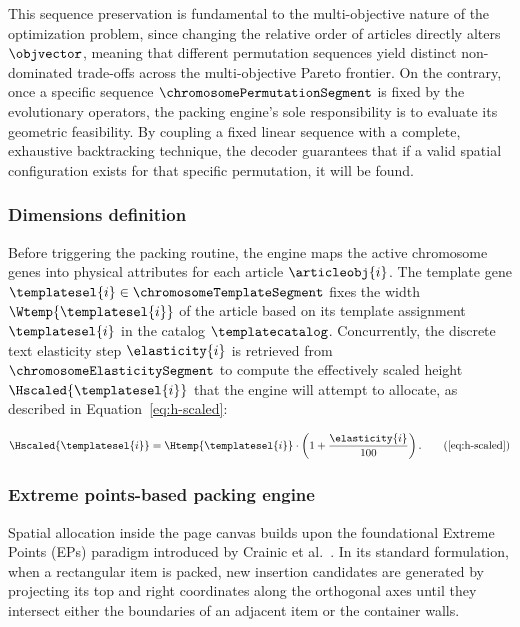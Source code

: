 This sequence preservation is fundamental to the multi-objective nature of the optimization problem, since changing the relative order of articles directly alters $\objvector$, meaning that different permutation sequences yield distinct non-dominated trade-offs across the multi-objective Pareto frontier.
On the contrary, once a specific sequence $\chromosomePermutationSegment$ is fixed by the evolutionary operators, the packing engine's sole responsibility is to evaluate its geometric feasibility. By coupling a fixed linear sequence with a complete, exhaustive backtracking technique, the decoder guarantees that if a valid spatial configuration exists for that specific permutation, it will be found.

\subsubsection{Dimensions definition}
Before triggering the packing routine, the engine maps the active chromosome genes into  physical attributes for each article $\articleobj{i}$. The template gene $\templatesel{i} \in \chromosomeTemplateSegment$ fixes the width $\Wtemp{\templatesel{i}}$ of the article based on its template assignment $\templatesel{i}$ in the catalog $\templatecatalog$. Concurrently, the discrete text elasticity step $\elasticity{i}$ is retrieved from $\chromosomeElasticitySegment$ to compute the effectively scaled height $\Hscaled{\templatesel{i}}$ that the engine will attempt to allocate, as described in Equation~\ref{eq:h-scaled}:

\begin{equation}
\Hscaled{\templatesel{i}} = \Htemp{\templatesel{i}} \cdot \left(1 + \frac{\elasticity{i}}{100}\right).
\tag{\ref{eq:h-scaled}}
\end{equation}

\subsubsection{Extreme points-based packing engine}

Spatial allocation inside the page canvas builds upon the foundational Extreme Points (EPs) paradigm introduced by Crainic et al.~\cite{crainic-extreme-points}. In its standard formulation, when a rectangular item is packed, new insertion candidates are generated by projecting its top and right coordinates along the orthogonal axes until they intersect either the boundaries of an adjacent item or the container walls.


